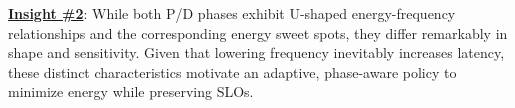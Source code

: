 



\textbf{\underline{Insight \#2}}: 
While both P/D phases exhibit U-shaped energy-frequency relationships and the corresponding energy sweet spots, they differ remarkably in shape and sensitivity.
Given that lowering frequency inevitably increases latency, these distinct characteristics motivate an adaptive, phase-aware policy to minimize energy while preserving SLOs. 



